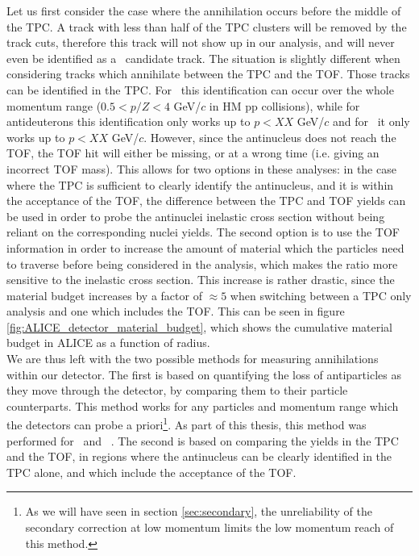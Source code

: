 Let us first consider the case where the annihilation occurs before the middle of the TPC. A track with less than half of the TPC clusters will be removed by the track cuts, therefore this track will not show up in our analysis, and will never even be identified as a \ahe\ candidate track. The situation is slightly different when considering tracks which annihilate between the TPC and the TOF. Those tracks can be identified in the TPC. For \ahe\ this identification can occur over the whole momentum range ($0.5<p/Z<4$ GeV/$c$ in HM pp collisions), while for antideuterons this identification only works up to $p<XX$ GeV/$c$ and for \atrit\ it only works up to $p<XX$ GeV/$c$. However, since the antinucleus does not reach the TOF, the TOF hit will either be missing, or at a wrong time (i.e. giving an incorrect TOF mass). This allows for two options in these analyses: in the case where the TPC is sufficient to clearly identify the antinucleus, and it is within the acceptance of the TOF, the difference between the TPC and TOF yields can be used in order to probe the antinuclei inelastic cross section without being reliant on the corresponding nuclei yields. The second option is to use the TOF information in order to increase the amount of material which the particles need to traverse before being considered in the analysis, which makes the ratio more sensitive to the inelastic cross section. This increase is rather drastic, since the material budget increases by a factor of $\approx 5$ when switching between a TPC only analysis and one which includes the TOF. This can be seen in figure \ref{fig:ALICE_detector_material_budget}, which shows the cumulative material budget in ALICE as a function of radius. \\

We are thus left with the two possible methods for measuring annihilations within our detector. The first is based on quantifying the loss of antiparticles as they move through the detector, by comparing them to their particle counterparts. This method works for any particles and momentum range which the detectors can probe a priori\footnote{As we will have seen in section \ref{sec:secondary}, the unreliability of the secondary correction at low momentum limits the low momentum reach of this method.}. As part of this thesis, this method was performed for \ahe\ and \atrit\ . The second is based on comparing the yields in the TPC and the TOF, in regions where the antinucleus can be clearly identified in the TPC alone, and which include the acceptance of the TOF. \\

